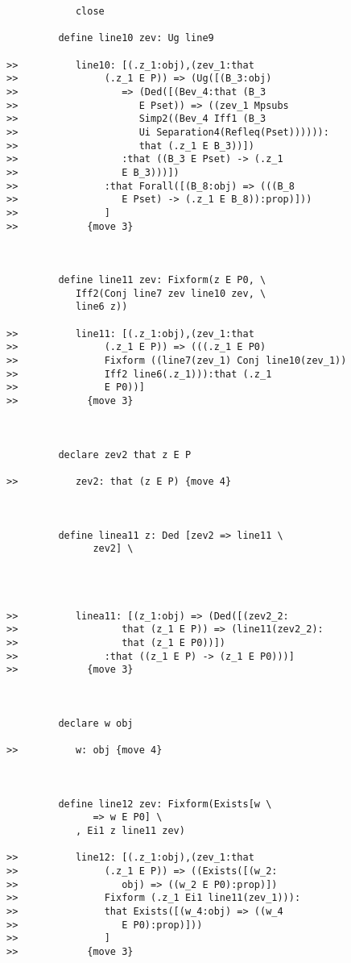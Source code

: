 \documentclass[12pt]{article}
\begin{document}
\begin{verbatim}
            close

         define line10 zev: Ug line9

>>          line10: [(.z_1:obj),(zev_1:that
>>               (.z_1 E P)) => (Ug([(B_3:obj)
>>                  => (Ded([(Bev_4:that (B_3
>>                     E Pset)) => ((zev_1 Mpsubs
>>                     Simp2((Bev_4 Iff1 (B_3
>>                     Ui Separation4(Refleq(Pset)))))):
>>                     that (.z_1 E B_3))])
>>                  :that ((B_3 E Pset) -> (.z_1
>>                  E B_3)))])
>>               :that Forall([(B_8:obj) => (((B_8
>>                  E Pset) -> (.z_1 E B_8)):prop)]))
>>               ]
>>            {move 3}



         define line11 zev: Fixform(z E P0, \
            Iff2(Conj line7 zev line10 zev, \
            line6 z))

>>          line11: [(.z_1:obj),(zev_1:that
>>               (.z_1 E P)) => (((.z_1 E P0)
>>               Fixform ((line7(zev_1) Conj line10(zev_1))
>>               Iff2 line6(.z_1))):that (.z_1
>>               E P0))]
>>            {move 3}



         declare zev2 that z E P

>>          zev2: that (z E P) {move 4}



         define linea11 z: Ded [zev2 => line11 \
               zev2] \
            



>>          linea11: [(z_1:obj) => (Ded([(zev2_2:
>>                  that (z_1 E P)) => (line11(zev2_2):
>>                  that (z_1 E P0))])
>>               :that ((z_1 E P) -> (z_1 E P0)))]
>>            {move 3}



         declare w obj

>>          w: obj {move 4}



         define line12 zev: Fixform(Exists[w \
               => w E P0] \
            , Ei1 z line11 zev)

>>          line12: [(.z_1:obj),(zev_1:that
>>               (.z_1 E P)) => ((Exists([(w_2:
>>                  obj) => ((w_2 E P0):prop)])
>>               Fixform (.z_1 Ei1 line11(zev_1))):
>>               that Exists([(w_4:obj) => ((w_4
>>                  E P0):prop)]))
>>               ]
>>            {move 3}




\end{verbatim}
\end{document}
